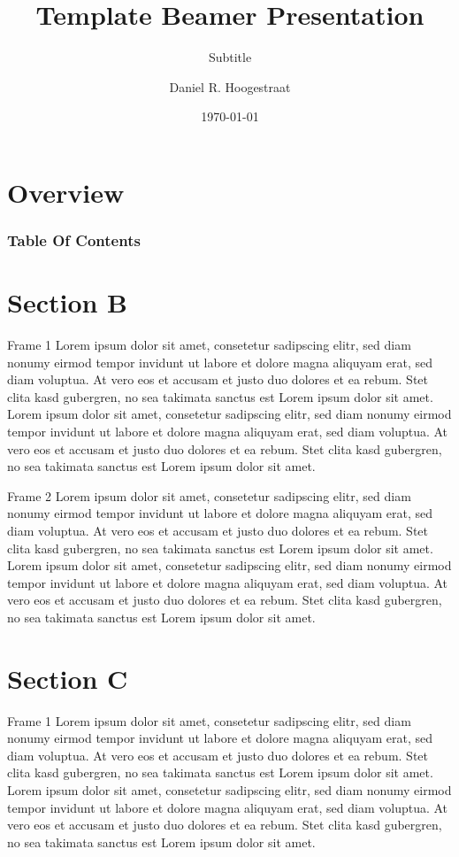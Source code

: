\documentclass{beamer} %
\title{Template Beamer Presentation}
\subtitle{Subtitle}
\author{Daniel R. Hoogestraat}
\institute{Molecular Diagnosis Microbiology Division\\University of Washington {\Medium Seattle, WA}}
\date{\today}
\begin{document}
\maketitle

\section*{Overview}
\begin{frame}
	\frametitle{Table Of Contents}
	\tableofcontents[hideallsubsections]
\end{frame}

\section{Section B}

\begin{frame}{Frame 1}
	Lorem ipsum dolor sit amet, consetetur sadipscing elitr, sed diam nonumy eirmod tempor invidunt ut labore et dolore magna aliquyam erat, sed diam voluptua. At vero eos et accusam et justo duo dolores et ea rebum. Stet clita kasd gubergren, no sea takimata sanctus est Lorem ipsum dolor sit amet. Lorem  ipsum dolor sit amet, consetetur sadipscing elitr, sed diam nonumy eirmod tempor invidunt ut labore et dolore magna aliquyam erat, sed diam voluptua. At vero eos et accusam et justo duo dolores et ea rebum. Stet clita kasd gubergren, no sea takimata sanctus est Lorem ipsum dolor sit amet.
\end{frame}

\begin{frame}{Frame 2}
	Lorem ipsum dolor sit amet, consetetur sadipscing elitr, sed diam nonumy eirmod tempor invidunt ut labore et dolore magna aliquyam erat, sed diam voluptua. At vero eos et accusam et justo duo dolores et ea rebum. Stet clita kasd gubergren, no sea takimata sanctus est Lorem ipsum dolor sit amet. Lorem  ipsum dolor sit amet, consetetur sadipscing elitr, sed diam nonumy eirmod tempor invidunt ut labore et dolore magna aliquyam erat, sed diam voluptua. At vero eos et accusam et justo duo dolores et ea rebum. Stet clita kasd gubergren, no sea takimata sanctus est Lorem ipsum dolor sit amet.
\end{frame}

\section{Section C}
\begin{frame}{Frame 1}
	Lorem ipsum dolor sit amet, consetetur sadipscing elitr, sed diam nonumy eirmod tempor invidunt ut labore et dolore magna aliquyam erat, sed diam voluptua. At vero eos et accusam et justo duo dolores et ea rebum. Stet clita kasd gubergren, no sea takimata sanctus est Lorem ipsum dolor sit amet. Lorem  ipsum dolor sit amet, consetetur sadipscing elitr, sed diam nonumy eirmod tempor invidunt ut labore et dolore magna aliquyam erat, sed diam voluptua. At vero eos et accusam et justo duo dolores et ea rebum. Stet clita kasd gubergren, no sea takimata sanctus est Lorem ipsum dolor sit amet.
\end{frame}
\end{document}
